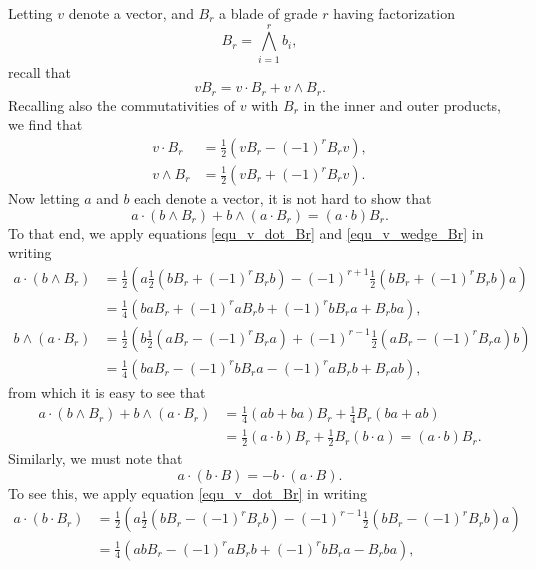 \documentclass{birkjour}
\theoremstyle{definition}
\theoremstyle{remark}
\numberwithin{equation}{section}
\begin{document}
Letting $v$ denote a vector, and $B_r$ a blade of grade $r$ having factorization
\begin{equation}\label{equ_B_r}
B_r = \bigwedge_{i=1}^r b_i,
\end{equation}
recall that
\begin{equation}
vB_r = v\cdot B_r + v\wedge B_r.
\end{equation}
Recalling also the commutativities of $v$ with $B_r$ in the inner and outer products, we find that
\begin{align}
v\cdot B_r &= \frac{1}{2}(vB_r-(-1)^rB_rv),\label{equ_v_dot_Br} \\
v\wedge B_r &= \frac{1}{2}(vB_r+(-1)^rB_rv).\label{equ_v_wedge_Br}
\end{align}
Now letting $a$ and $b$ each denote a vector, it is not hard to show that
\begin{equation}\label{equ_a_dot_b_Br_identity}
a\cdot(b\wedge B_r) + b\wedge(a\cdot B_r) = (a\cdot b)B_r.
\end{equation}
To that end, we apply equations \eqref{equ_v_dot_Br} and \eqref{equ_v_wedge_Br} in writing
\begin{align*}
a\cdot(b\wedge B_r)
 &= \frac{1}{2}\left(a\frac{1}{2}\left(bB_r + (-1)^rB_rb\right)-(-1)^{r+1}\frac{1}{2}\left(bB_r+(-1)^rB_rb\right)a\right) \\
 &= \frac{1}{4}\left(baB_r + (-1)^raB_rb + (-1)^rbB_ra + B_rba\right), \\
b\wedge(a\cdot B_r)
 &= \frac{1}{2}\left(b\frac{1}{2}\left(aB_r-(-1)^rB_ra\right)+(-1)^{r-1}\frac{1}{2}\left(aB_r-(-1)^rB_ra\right)b\right) \\
 &= \frac{1}{4}\left(baB_r - (-1)^rbB_ra - (-1)^raB_rb + B_rab\right),
\end{align*}
from which it is easy to see that
\begin{align*}
a\cdot(b\wedge B_r)+b\wedge(a\cdot B_r) &= \frac{1}{4}(ab+ba)B_r + \frac{1}{4}B_r(ba+ab) \\
 &= \frac{1}{2}(a\cdot b)B_r + \frac{1}{2}B_r(b\cdot a) = (a\cdot b)B_r.
\end{align*}
Similarly, we must note that
\begin{equation}
a\cdot(b\cdot B) = -b\cdot(a\cdot B).
\end{equation}
To see this, we apply equation \eqref{equ_v_dot_Br} in writing
\begin{align*}
a\cdot(b\cdot B_r)
 &= \frac{1}{2}\left(a\frac{1}{2}\left(bB_r-(-1)^rB_rb\right)-(-1)^{r-1}\frac{1}{2}\left(bB_r-(-1)^rB_rb\right)a\right) \\
 &= \frac{1}{4}\left(abB_r - (-1)^raB_rb + (-1)^rbB_ra - B_rba\right),
\end{align*}
\end{document}
